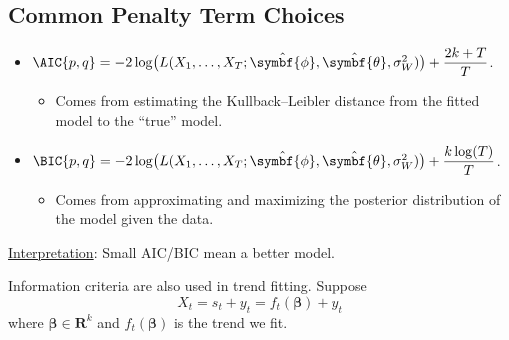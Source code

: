 \subsection*{Common Penalty Term Choices}
\begin{itemize}
    \item $ \AIC{p,q}=-2\log\bigl(L(X_1,\ldots,X_T;\hat{\symbf{\phi}},\hat{\symbf{\theta}},\sigma_W^2)\bigr)+\dfrac{2k+T}{T} $.
          \begin{itemize}
              \item Comes from estimating the Kullback–Leibler distance from the fitted model to the ``true'' model.
          \end{itemize}
    \item $ \BIC{p,q}=-2\log\bigl(L(X_1,\ldots,X_T;\hat{\symbf{\phi}},\hat{\symbf{\theta}},\sigma_W^2)\bigr)+\dfrac{k\log(T)}{T} $.
          \begin{itemize}
              \item Comes from approximating and maximizing the posterior distribution of the model given the data.
          \end{itemize}
\end{itemize}
\underline{Interpretation}: Small AIC/BIC mean a better model.

Information criteria are also used in trend fitting. Suppose
\[ X_t=s_t+y_t=f_t(\symbf{\beta})+y_t \]
where $ \symbf{\beta}\in\mathbf{R}^k $ and $ f_t(\symbf{\beta}) $ is the trend we fit.

